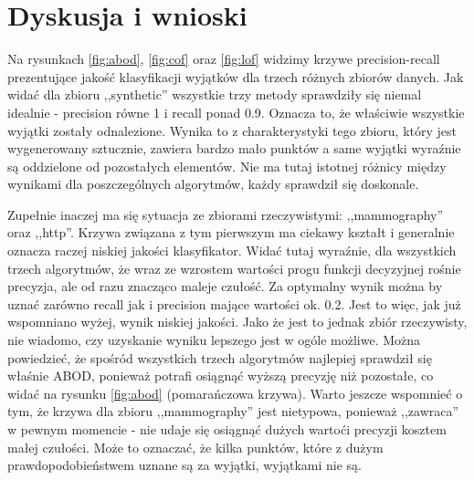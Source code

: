 \documentclass{classrep}
\begin{document}
    \section{Dyskusja i wnioski} {
        Na rysunkach \ref{fig:abod}, \ref{fig:cof} oraz \ref{fig:lof}
        widzimy krzywe precision-recall prezentujące jakość klasyfikacji
        wyjątków dla trzech różnych zbiorów danych. Jak widać dla zbioru
        ,,synthetic'' wszystkie trzy metody sprawdziły się niemal idealnie
        - precision równe 1 i recall ponad 0.9. Oznacza to, że właściwie
        wszystkie wyjątki zostały odnalezione. Wynika to z charakterystyki
        tego zbioru, który jest wygenerowany sztucznie, zawiera bardzo mało
        punktów a same wyjątki wyraźnie są oddzielone od pozostałych
        elementów. Nie ma tutaj istotnej różnicy między wynikami dla
        poszczególnych algorytmów, każdy sprawdził się doskonale.

        Zupełnie inaczej ma się sytuacja ze zbiorami rzeczywistymi:
        ,,mammography'' oraz ,,http''. Krzywa związana z tym pierwszym ma
        ciekawy kształt i generalnie oznacza raczej niskiej jakości
        klasyfikator. Widać tutaj wyraźnie, dla wszystkich trzech
        algorytmów, że wraz ze wzrostem wartości progu funkcji decyzyjnej
        rośnie precyzja, ale od razu znacząco maleje czułość. Za optymalny
        wynik można by uznać zarówno recall jak i precision mające wartości
        ok. 0.2. Jest to więc, jak już wspomniano wyżej, wynik niskiej
        jakości. Jako że jest to jednak zbiór rzeczywisty, nie wiadomo, czy
        uzyskanie wyniku lepszego jest w ogóle możliwe. Można powiedzieć,
        że spośród wszystkich trzech algorytmów najlepiej sprawdził się
        właśnie ABOD, ponieważ potrafi osiągnąć wyższą precyzję niż
        pozostałe, co widać na rysunku \ref{fig:abod} (pomarańczowa
        krzywa). Warto jeszcze wspomnieć o tym, że krzywa dla zbioru
        ,,mammography'' jest nietypowa, ponieważ ,,zawraca'' w pewnym
        momencie - nie udaje się osiągnąć dużych wartoći precyzji kosztem
        małej czułości. Może to oznaczać, że kilka punktów, które z dużym
        prawdopodobieństwem uznane są za wyjątki, wyjątkami nie są.

}
\end{document}
